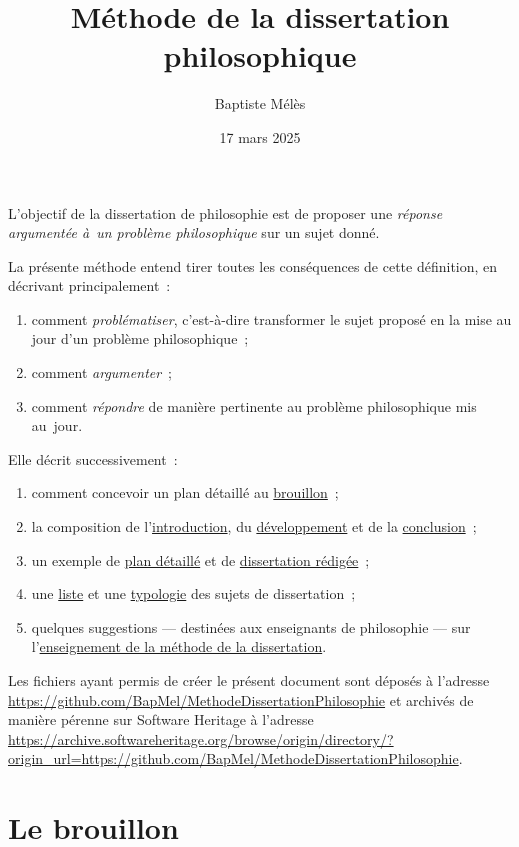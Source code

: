 \documentclass[a4paper,12pt]{report}
\author{Baptiste Mélès}
\date{17 mars 2025}
\title{Méthode de la dissertation philosophique}
\begin{document}
\maketitle
\bigskip

L'objectif de la dissertation de philosophie est de proposer une
\emph{réponse argumentée à un problème philosophique} sur un sujet donné.

La présente méthode entend tirer toutes les conséquences de cette
définition, en décrivant principalement :
\begin{enumerate}
\item comment \emph{problématiser}, c'est-à-dire transformer le sujet proposé en la
mise au jour d'un problème philosophique ;
\item comment \emph{argumenter} ;
\item comment \emph{répondre} de manière pertinente au problème philosophique
mis au jour.
\end{enumerate}

Elle décrit successivement :
\begin{enumerate}
\item comment concevoir un plan détaillé au \hyperref[org6e501f7]{brouillon} ;
\item la composition de l'\hyperref[org9a63b2a]{introduction}, du \hyperref[org4a22d50]{développement} et de la
\hyperref[org1b941f1]{conclusion} ;
\item un exemple de \hyperref[orgadb731c]{plan détaillé} et de \hyperref[orgb3b774b]{dissertation rédigée} ;
\item une \hyperref[orgf317b59]{liste} et une \hyperref[org8349b4a]{typologie} des sujets de dissertation ;
\item quelques suggestions — destinées aux enseignants de philosophie — sur
l'\hyperref[org6292f56]{enseignement de la méthode de la dissertation}.
\end{enumerate}

Les fichiers ayant permis de créer le présent document sont déposés à
l'adresse \url{https://github.com/BapMel/MethodeDissertationPhilosophie} et
archivés de manière pérenne sur Software Heritage à l'adresse
\url{https://archive.softwareheritage.org/browse/origin/directory/?origin\_url=https://github.com/BapMel/MethodeDissertationPhilosophie}.

\setcounter{tocdepth}{3}
\tableofcontents

\part{Le brouillon}
\label{sec:org8e4f210}
\label{org6e501f7}
\end{document}

